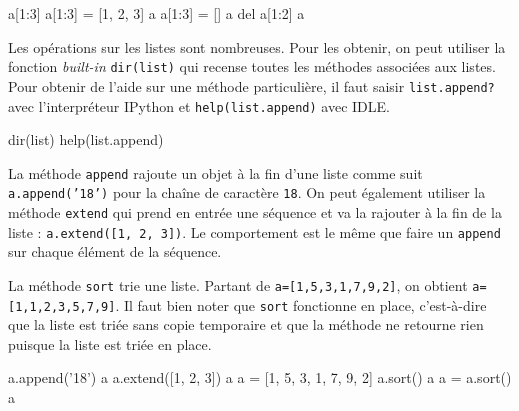 \vspace{2pt}

\begin{idleconsole}
\begin{pyconsole}
a[1:3]
a[1:3] = [1, 2, 3]
a
a[1:3] = []
a
del a[1:2]
a
\end{pyconsole}
\end{idleconsole}

\vspace{2pt}

Les opérations sur les listes sont nombreuses. Pour les obtenir, on peut utiliser la fonction \textit{built-in} \texttt{dir(list)} qui recense toutes les méthodes associées aux listes. Pour obtenir de l'aide sur une méthode particulière, il faut saisir \texttt{list.append?} avec l'interpréteur IPython et \texttt{help(list.append)} avec IDLE.

\begin{idleconsole*}
\begin{pyconsole}[][breaklines]
dir(list)
help(list.append)
\end{pyconsole}
\end{idleconsole*}

\vspace{2pt}

La méthode \texttt{append} rajoute un objet à la fin d'une liste comme suit \texttt{a.append('18')} pour la chaîne de caractère \texttt{18}. On peut également utiliser la méthode \texttt{extend} qui prend en entrée une séquence et va la rajouter à la fin de la liste : \texttt{a.extend([1, 2, 3])}. Le comportement est le même que faire un \texttt{append} sur chaque élément de la séquence.

La méthode \texttt{sort} trie une liste. Partant de \texttt{a=[1,5,3,1,7,9,2]}, on obtient \texttt{a=[1,1,2,3,5,7,9]}. Il faut bien noter que \texttt{sort} fonctionne en place, c'est-à-dire que la liste est triée sans copie temporaire et que la méthode ne retourne rien puisque la liste est triée en place.

\vspace{2pt}

\begin{idleconsole}
\begin{pyconsole}
a.append('18')
a
a.extend([1, 2, 3])
a
a = [1, 5, 3, 1, 7, 9, 2]
a.sort()
a
a = a.sort()
a
\end{pyconsole}
\end{idleconsole}

\vspace{2pt}

